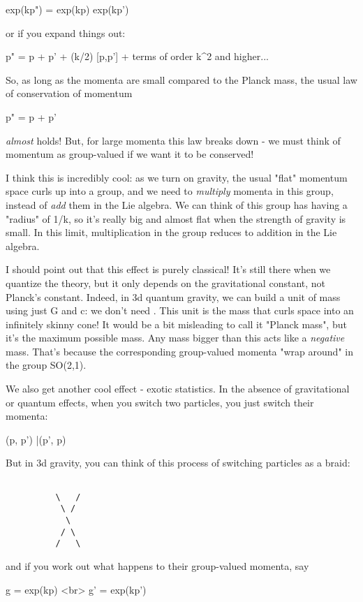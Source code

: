 exp(kp") = exp(kp) exp(kp') 

or if you expand things out:

p" = p + p' + (k/2) [p,p'] + terms of order k^{2} and higher... 

So, as long as the momenta are small compared to the Planck mass, 
the usual law of conservation of momentum

p" = p + p'

\emph{almost} holds!   But, for large momenta this law breaks down - we 
must think of momentum as group-valued if we want it to be conserved!

I think this is incredibly cool: as we turn on gravity, the usual
"flat" momentum space curls up into a group, and we need to
\emph{multiply} momenta in this group, instead of \emph{add} them
in the Lie algebra.  We can think of this group has having a
"radius" of 1/k, so it's really big and almost flat when the
strength of gravity is small.  In this limit, multiplication in the
group reduces to addition in the Lie algebra.

I should point out that this effect is purely classical!  It's still
there when we quantize the theory, but it only depends on the
gravitational constant, not Planck's constant.  Indeed, in 3d quantum
gravity, we can build a unit of mass using just G and c: we don't need
\hbar .  This unit is the mass that curls space into an infinitely
skinny cone!  It would be a bit misleading to call it "Planck
mass", but it's the maximum possible mass.  Any mass bigger than
this acts like a \emph{negative} mass.  That's because the corresponding
group-valued momenta "wrap around" in the group SO(2,1).

We also get another cool effect - exotic statistics.  In the absence 
of gravitational or quantum effects, when you switch two particles, 
you just switch their momenta:

(p, p') |\to  (p', p) 

But in 3d gravity, you can think of this process of switching 
particles as a braid: 


\begin{verbatim}

          \   /
           \ / 
            \
           / \
          /   \
\end{verbatim}
    

and if you work out what happens to their group-valued momenta,
say  

g  = exp(kp) <br>
g' = exp(kp')

